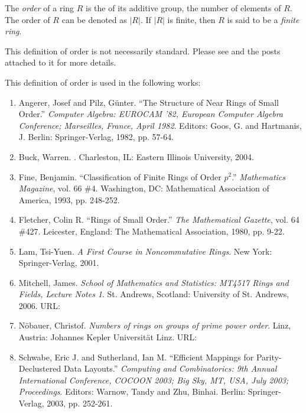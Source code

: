 \documentclass[12pt]{article}
\begin{document}
The \emph{order} of a ring $R$ is the  of its additive group,  the number of elements of $R$.  The order of $R$ can be denoted as $\vert R \vert$.  If $\vert R \vert$ is finite, then $R$ is said to be a \emph{finite ring}.

This definition of order is not necessarily standard.  Please see  and the posts attached to it for more details.

This definition of order is used in the following works:

\begin{enumerate}
\item Angerer, Josef and Pilz, G\"{u}nter.  ``The Structure of Near Rings of Small Order.''  \emph{Computer Algebra: EUROCAM '82, European Computer Algebra Conference; Marseilles, France, April 1982}.  Editors: Goos, G. and Hartmanis, J.  Berlin: Springer-Verlag, 1982, pp. 57-64.

\item Buck, Warren.  \emph{}.  Charleston, IL: Eastern Illinois University, 2004.

\item Fine, Benjamin.  ``Classification of Finite Rings of Order $p^2$.''  \emph{Mathematics Magazine}, vol. 66 \#4.  Washington, DC: Mathematical Association of America, 1993, pp. 248-252.

\item Fletcher, Colin R.  ``Rings of Small Order.''  \emph{The Mathematical Gazette}, vol. 64 \#427.  Leicester, England: The Mathematical Association, 1980, pp. 9-22.

\item Lam, Tsi-Yuen.  \emph{A First Course in Noncommutative Rings}.  New York: Springer-Verlag, 2001.

\item Mitchell, James.  \emph{School of Mathematics and Statistics: MT4517 Rings and Fields, Lecture Notes 1}.  St. Andrews, Scotland: University of St. Andrews, 2006.  URL: 

\item N\"{o}bauer, Christof.  \emph{Numbers of rings on groups of prime power order}.  Linz, Austria: Johannes Kepler Universit\"{a}t Linz.  URL: 

\item Schwabe, Eric J. and Sutherland, Ian M.  ``Efficient Mappings for Parity-Declustered Data Layouts.''  \emph{Computing and Combinatorics: 9th Annual International Conference, COCOON 2003; Big Sky, MT, USA, July 2003; Proceedings}.  Editors: Warnow, Tandy and Zhu, Binhai.  Berlin: Springer-Verlag, 2003, pp. 252-261.
\end{enumerate}
\end{document}

